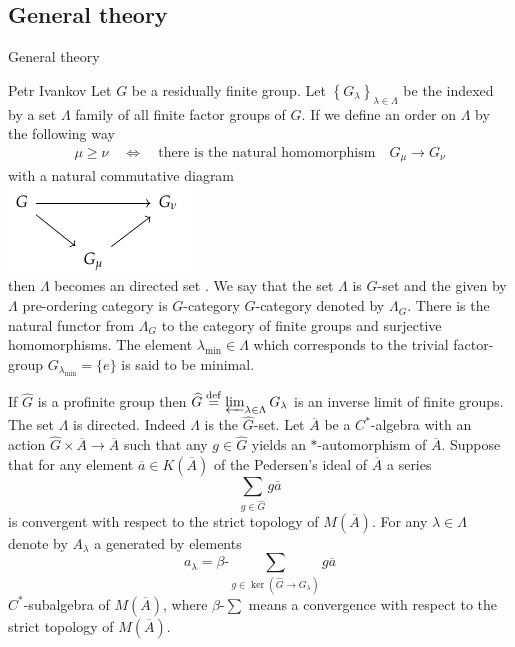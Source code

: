 \documentclass{beamer}
\theoremstyle{plain}
\newcommand{\be}{\begin{equation}}
\newcommand{\ee}{\end{equation}}
\newcommand{\la}{\lambda}
\newcommand{\La}{\Lambda}
\newcommand{\bt}{\beta}           %
\newcommand{\bean}{\begin{eqnarray*}}
\newcommand{\eean}{\end{eqnarray*}}
\newcommand{\bydef}{\stackrel{\mathrm{def}}{=}}
\begin{document}
\subsection{General theory}
\begin{frame}
	\huge General theory \normalsize \\
 \begin{definition}\label{g_category_defn}\alert{Petr Ivankov}
	Let $ G$ be a residually finite group. 
	Let $\left\{G_\la\right\}_{\la\in \La}$ be the indexed by a set $\La$ family of all finite factor groups of $ G$. If we define an order on $\La$ by the following way
	\bean\label{top_group_order_eqn}
	\mu \ge \nu \quad \Leftrightarrow \quad \text{there is the natural homomorphism} \quad G_\mu \to G_\nu
	\eean
	with a natural commutative diagram
	\\
	\includegraphics[scale=0.8]{g.png}
	\\
	then $\La$ becomes an directed set . We say that the set $\La$ is $  G$-\alert{set} and the given by $\La$ pre-ordering category  is $  G$-\alert{category}  $  G$-{category} denoted by $\La_{ G }$.
	There is the natural functor from $\La_{ G }$ to the category of finite groups and surjective homomorphisms. The element $\la_{\min }\in \La$ which corresponds to the trivial factor-group $G_{\la_{\min}}= \{e\}$ is said to be \alert{minimal}.
\end{definition}
\end{frame}
\begin{frame}
 	If  $\widehat{G}$ is a profinite group   then 
$\widehat{G} \bydef \varprojlim_{\la \in \La}  G_\la$ is an inverse limit of finite groups. The set $\La$ is directed. Indeed $\La$ is the $\widehat{G}$-set. Let $\overline A$ be a $C^*$-algebra with an action $\widehat{G}\times \overline A\to \overline A$ such that any $ g \in \widehat G$ yields an $*$-automorphism of $\overline A$.	  
Suppose that for any element $\overline a \in K\left(\overline A \right)$ of the Pedersen's ideal of $\overline A$  a series 
\be\label{infinite_covering_basic_eqn}
\sum_{	g \in \widehat{G}}g \overline a
\ee
is convergent with respect to the strict topology of $M\left(\overline A\right)$.  For any $\la \in \La$ denote by $A_\la$ a generated by elements
\be\label{basic_cov_cl_eqn}
a_\la =\bt\text{-} \sum_{	g \in \ker\left( \widehat{G}\to G_\la\right) }g \overline a
\ee
$C^*$-subalgebra of $M\left(\overline A\right)$, where  $\bt\text{-} \sum$ means a convergence  with respect to the strict topology of $M\left(\overline A\right)$. 
\end{frame}
\end{document}
